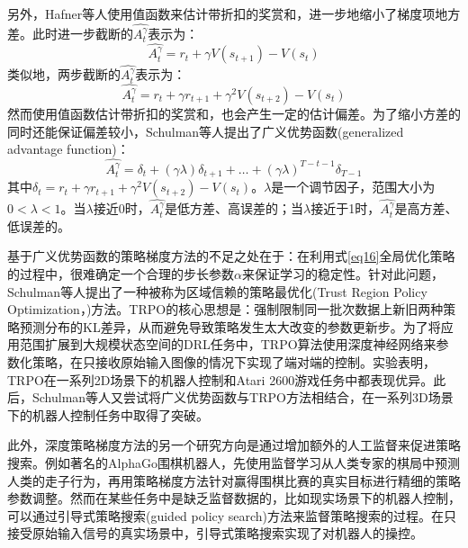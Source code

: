 \documentclass[bachelor]{thesis-uestc}
\begin{document}
	另外，Hafner等人使用值函数来估计带折扣的奖赏和，进一步地缩小了梯度项地方差。此时进一步截断的$\hat{A_t^\gamma}$表示为：
	\begin{equation}
		\label{eq20}
		\hat{A_t^\gamma}=r_t+\gamma V(s_{t+1})-V(s_t)
	\end{equation}
	类似地，两步截断的$\hat{A_t^\gamma}$表示为：
	\begin{equation}
		\label{eq21}
		\hat{A_t^\gamma}=r_t+\gamma r_{t+1}+\gamma^2V(s_{t+2})-V(s_t)
	\end{equation}
	然而使用值函数估计带折扣的奖赏和，也会产生一定的估计偏差。为了缩小方差的同时还能保证偏差较小，Schulman等人提出了广义优势函数(generalized advantage function)：
	\begin{equation}
		\label{eq22}
		\hat{A_t^\gamma}=\delta_t+(\gamma\lambda)\delta_{t+1}+\dots+(\gamma\lambda)^{T-t-1}\delta_{T-1}
	\end{equation}
	其中$\delta_t=r_t+\gamma r_{t+1}+\gamma^2V(s_{t+2})-V(s_t)$。$\lambda$是一个调节因子，范围大小为$0<\lambda<1$。当$\lambda$接近0时，$\hat{A_t^\gamma}$是低方差、高误差的；当$\lambda$接近于1时，$\hat{A_t^\gamma}$是高方差、低误差的。
	
	基于广义优势函数的策略梯度方法的不足之处在于：在利用式\ref{eq16}全局优化策略的过程中，很难确定一个合理的步长参数$\alpha$来保证学习的稳定性。针对此问题，Schulman\cite{Schulman2015Trust}等人提出了一种被称为区域信赖的策略最优化(Trust Region Policy Optimization，)方法。TRPO的核心思想是：强制限制同一批次数据上新旧两种策略预测分布的KL差异，从而避免导致策略发生太大改变的参数更新步。为了将应用范围扩展到大规模状态空间的DRL任务中，TRPO算法使用深度神经网络来参数化策略，在只接收原始输入图像的情况下实现了端对端的控制。实验表明，TRPO在一系列2D场景下的机器人控制和Atari 2600游戏任务中都表现优异。此后，Schulman等人又尝试将广义优势函数与TRPO方法相结合，在一系列3D场景下的机器人控制任务中取得了突破。
	
	此外，深度策略梯度方法的另一个研究方向是通过增加额外的人工监督来促进策略搜索。例如著名的AlphaGo围棋机器人，先使用监督学习从人类专家的棋局中预测人类的走子行为，再用策略梯度方法针对赢得围棋比赛的真实目标进行精细的策略参数调整。然而在某些任务中是缺乏监督数据的，比如现实场景下的机器人控制，可以通过引导式策略搜索(guided policy search)方法来监督策略搜索的过程。在只接受原始输入信号的真实场景中，引导式策略搜索实现了对机器人的操控。
	
\end{document}
